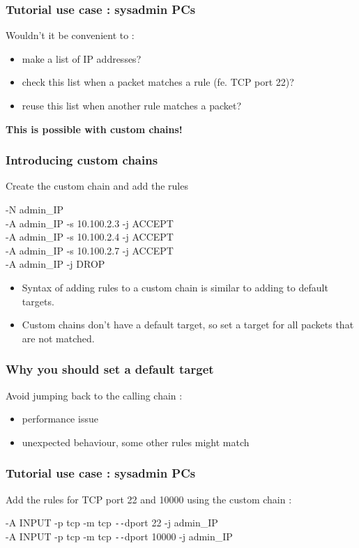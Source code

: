 \documentclass[14pt]{beamer}
\newcommand{\dd}{{\texttt{-{}-}}}
\begin{document}
  \begin{frame}
    \frametitle{Tutorial use case : sysadmin PCs}
    Wouldn't it be convenient to :
    \begin{itemize}
      \item make a list of IP addresses?
      \item check this list when a packet matches a rule (fe. TCP port 22)?
      \item reuse this list when another rule matches a packet?
    \end{itemize}
    \pause
    \textbf{This is possible with custom chains!}
  \end{frame}
  \begin{frame}
    \frametitle{Introducing custom chains}
    Create the custom chain and add the rules
    \begin{example}
      \small{-N admin\_IP\\
      \pause
      -A admin\_IP -s 10.100.2.3 -j ACCEPT\\
      -A admin\_IP -s 10.100.2.4 -j ACCEPT\\
      -A admin\_IP -s 10.100.2.7 -j ACCEPT\\
      -A admin\_IP -j DROP}
    \end{example}
    \pause
    \begin{itemize}[<+->]
      \item Syntax of adding rules to a custom chain is similar to adding to default targets.
      \item Custom chains don't have a default target, so set a target for all packets that are not matched.
    \end{itemize}
  \end{frame}
  \begin{frame}
    \frametitle{Why you should set a default target}
    Avoid jumping back to the calling chain :
    \begin{itemize}
      \item performance issue
      \item unexpected behaviour, some other rules might match
    \end{itemize}
 \end{frame}
  \begin{frame}
    \frametitle{Tutorial use case : sysadmin PCs}
    Add the rules for TCP port 22 and 10000 using the custom chain :
    \begin{example}
      \small{-A INPUT -p tcp -m tcp \dd dport 22 -j admin\_IP\\
      -A INPUT -p tcp -m tcp \dd dport 10000 -j admin\_IP}
    \end{example}
  \end{frame}
\end{document}
